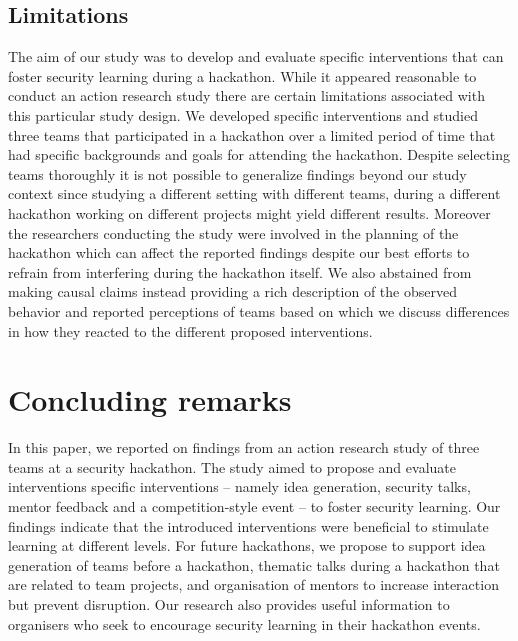 \documentclass[runningheads]{llncs}
\begin{document}
\subsection{Limitations}
The aim of our study was to develop and evaluate specific interventions that can foster security learning during a hackathon. While it appeared reasonable to conduct an action research study \cite{lewin1946action} there are certain limitations associated with this particular study design. We developed specific interventions and studied three teams that participated in a hackathon over a limited period of time that had specific backgrounds and goals for attending the hackathon. Despite selecting teams thoroughly it is not possible to generalize findings beyond our study context since studying a different setting with different teams, during a different hackathon working on different projects might yield different results. Moreover the researchers conducting the study were involved in the planning of the hackathon which can affect the reported findings despite our best efforts to refrain from interfering during the hackathon itself. We also abstained from making causal claims instead providing a rich description of the observed behavior and reported perceptions of teams based on which we discuss differences in how they reacted to the different proposed interventions.

\section{Concluding remarks}
In this paper, we reported on findings from an action research study of three teams at a security hackathon. The study aimed to propose and evaluate interventions specific interventions -- namely idea generation, security talks, mentor feedback and a competition-style event -- to foster security learning. Our findings indicate that the introduced interventions were beneficial to stimulate learning at different levels. For future hackathons, we propose to support idea generation of teams before a hackathon, thematic talks during a hackathon that are related to team projects, and organisation of mentors to increase interaction but prevent disruption. Our research also provides useful information to organisers who seek to encourage security learning in their hackathon events. 




\end{document}

